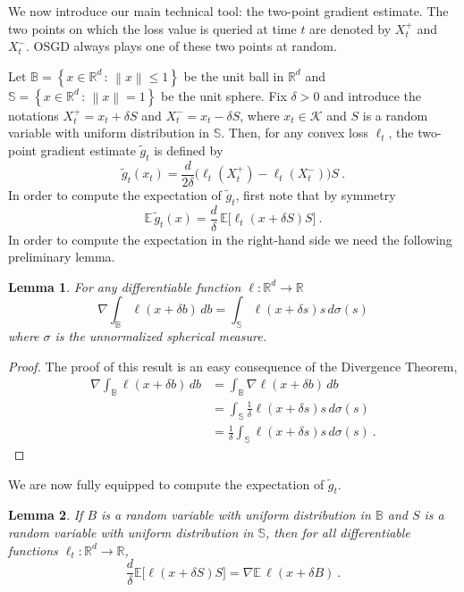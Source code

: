 \documentclass[11pt]{hackednow}
\newtheorem{lemma}{Lemma}[chapter]
\newcommand{\E}{\mathbb{E}}
\newcommand{\R}{\mathbb{R}}
\newcommand{\cK}{\mathcal{K}}
\newcommand{\theset}[2]{\left\{{#1}\,:\,{#2}\right\}}
\newcommand{\Ball}{\mathbb{B}}
\newcommand{\Sphere}{\mathbb{S}}
\newcommand{\norm}[1]{\left\|{#1}\right\|}
\newcommand{\gtilde}{\widetilde{g}}
\begin{document}
We now introduce our main technical tool: the two-point gradient estimate. The two points on which the loss value is queried at time $t$ are denoted by $X_t^+$ and $X_t^-$. OSGD always plays one of these two points at random.

Let $\Ball = \theset{x \in \R^d}{\norm{x} \le 1}$ be the unit ball in $\R^d$ and $\Sphere = \theset{x \in \R^d}{\norm{x} = 1}$ be the unit sphere.
Fix $\delta > 0$ and introduce the notations $X_t^+ = x_t + \delta S$ and $X_t^- = x_t - \delta S$, where $x_t \in \cK$ and $S$ is a random variable with uniform distribution in $\Sphere$. Then, for any convex loss $\ell_t$, the two-point gradient estimate $\gtilde_t$ is defined by
\begin{equation}
\label{eq:two-point-est}
    \gtilde_t(x_t) = \frac{d}{2\delta}\bigl(\ell_t(X_t^+) - \ell_t(X_t^-) \bigr)S~.
\end{equation}
In order to compute the expectation of $\gtilde_t$, first note that by symmetry
\[
    \E\,\gtilde_t(x) = \frac{d}{\delta}\,\E\bigl[\ell_t(x + \delta S)S\bigr]~.
\]
In order to compute the expectation in the right-hand side we need the following preliminary lemma.
\begin{lemma}
\label{l:divergence}
For any differentiable function $\ell : \R^d \to \R$
\[
    \nabla\int_{\Ball} \ell(x + \delta b)\,db = \int_{\Sphere} \ell(x + \delta s)s\,d\sigma(s)
\]
where $\sigma$ is the unnormalized spherical measure.
\end{lemma}
\begin{proof}
The proof of this result is an easy consequence of the Divergence Theorem,
\begin{align*}
    \nabla\int_{\Ball} \ell(x + \delta b)\,db
&=
    \int_{\Ball} \nabla \ell(x + \delta b)\,db
\\ &=
    \int_{\Sphere} \frac{1}{\delta} \ell(x + \delta s)s\,d \sigma(s)
\\ &=
    \frac{1}{\delta} \int_{\Sphere} \ell(x + \delta s)s\,d \sigma(s)~.
\end{align*}
\end{proof}
We are now fully equipped to compute the expectation of $\gtilde_t$.
\begin{lemma}
\label{l:stokes}
If $B$ is a random variable with uniform distribution in $\Ball$ and $S$ is a random variable with uniform distribution in $\Sphere$, then for all differentiable functions $\ell_t : \R^d\to\R$,
\[
    \frac{d}{\delta}\E\bigl[\ell(x + \delta S)S\bigr] = \nabla\E\,\ell(x + \delta B)~.
\]
\end{lemma}
\end{document}
